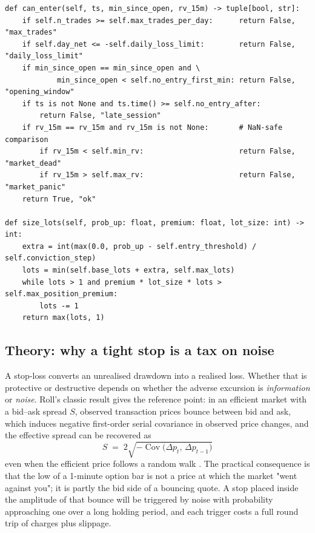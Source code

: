\documentclass[11pt,a4paper]{article}
\newcommand{\code}[1]{\texttt{#1}}
\begin{document}
\begin{lstlisting}[caption={Entry gates and conviction sizing (\code{src/risk/risk\_manager.py}).},
label={lst:risk}]
def can_enter(self, ts, min_since_open, rv_15m) -> tuple[bool, str]:
    if self.n_trades >= self.max_trades_per_day:      return False, "max_trades"
    if self.day_net <= -self.daily_loss_limit:        return False, "daily_loss_limit"
    if min_since_open == min_since_open and \
            min_since_open < self.no_entry_first_min: return False, "opening_window"
    if ts is not None and ts.time() >= self.no_entry_after:
        return False, "late_session"
    if rv_15m == rv_15m and rv_15m is not None:       # NaN-safe comparison
        if rv_15m < self.min_rv:                      return False, "market_dead"
        if rv_15m > self.max_rv:                      return False, "market_panic"
    return True, "ok"

def size_lots(self, prob_up: float, premium: float, lot_size: int) -> int:
    extra = int(max(0.0, prob_up - self.entry_threshold) / self.conviction_step)
    lots = min(self.base_lots + extra, self.max_lots)
    while lots > 1 and premium * lot_size * lots > self.max_position_premium:
        lots -= 1
    return max(lots, 1)
\end{lstlisting}

\subsection{Theory: why a tight stop is a tax on noise}

A stop-loss converts an unrealised drawdown into a realised loss. Whether that is
protective or destructive depends on whether the adverse excursion is \emph{information}
or \emph{noise}. Roll's classic result gives the reference point: in an efficient market
with a bid--ask spread $S$, observed transaction prices bounce between bid and ask, which
induces negative first-order serial covariance in observed price changes, and the
effective spread can be recovered as
\begin{equation}
S \;=\; 2\sqrt{-\operatorname{Cov}\big(\Delta p_t,\, \Delta p_{t-1}\big)}
\end{equation}
even when the efficient price follows a random walk \cite{roll}. The practical
consequence is that the low of a 1-minute option bar is not a price at which the market
"went against you"; it is partly the bid side of a bouncing quote. A stop placed inside
the amplitude of that bounce will be triggered by noise with probability approaching one
over a long holding period, and each trigger costs a full round trip of charges plus
slippage.
\end{document}
